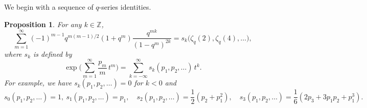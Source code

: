 \documentclass[a4paper]{article}
\theoremstyle{plain}
\newtheorem{proposition}[theorem]{Proposition}
\theoremstyle{definition}
\newcommand{\bz}{\mathbb{Z}}
\begin{document}
We begin with a sequence of $q$-series identities.


\begin{proposition} \label{prop:qident}
For any $k\in\bz$,
\begin{equation} \label{qident}
\sum_{m=1}^\infty(-1)^{m-1}q^{m(m-1)/2}(1+q^m)\frac{q^{mk}}{(1-q^m)^{2k}} = s_k \big( \zeta_q(2), \zeta_q(4), \ldots \big),
\end{equation}
where $s_k$ is defined by
\begin{equation} \label{eq:sk}
\exp \bigg(\sum_{m=1}^\infty \frac{p_m}{m} \, t^m \bigg) = \sum_{k=-\infty}^\infty s_k(p_1, p_2, \ldots) \, t^k.
\end{equation}
For example, we have $s_k(p_1, p_2, \ldots) = 0$ for $k < 0$ and
\[
s_0(p_1, p_2, \ldots) = 1, \  s_1(p_1, p_2, \ldots) = p_1, \quad s_2(p_1, p_2, \ldots) = \frac{1}{2}(p_2+p_1^2), \quad  s_3(p_1, p_2, \ldots) = \frac{1}{6}(2p_3 + 3p_1p_2 + p_1^3).
\]
\end{proposition}
\end{document}
